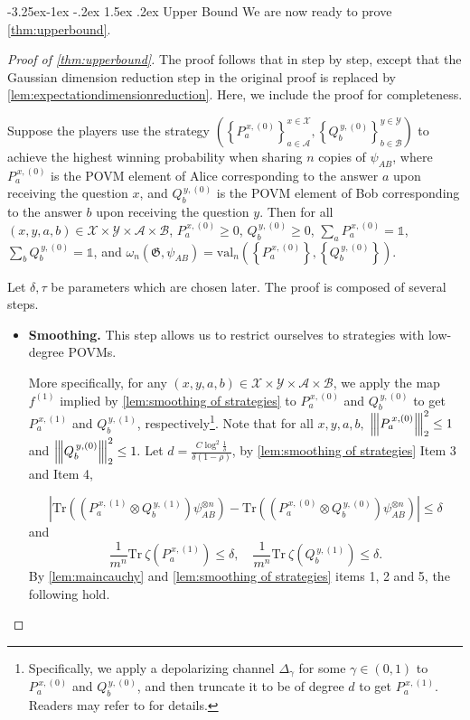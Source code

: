 \documentclass[10pt,a4paper]{article}
\makeatletter
\renewcommand{\subsection}{\@startsection{subsection}{2}{\z@}%
             {-3.25ex\@plus -1ex \@minus -.2ex}%
             {1.5ex \@plus .2ex}%
             {\normalfont\large\scshape\bfseries}}
\theoremstyle{plain}
\theoremstyle{definition}
\newcommand {\set} [1] {\ensuremath{ \left\lbrace #1 \right\rbrace }}
\newcommand {\br} [1] {\ensuremath{ \left( #1 \right) }}
\newcommand {\ab} [1] {\ensuremath{ \left| #1 \right| }}
\newcommand{\nnorm}[1]{{\left\vert\kern-0.25ex\left\vert\kern-0.25ex\left\vert #1
		\right\vert\kern-0.25ex\right\vert\kern-0.25ex\right\vert}}
\newcommand {\Tr} {\ensuremath{ \mathrm{Tr} }}
\newcommand {\id} {\ensuremath{\mathds{1}}}
\newcommand{\gval}[3]{\ensuremath{\mathrm{val}_{#1}\br{\set{#2},\set{#3}}}}
\newcommand{\fourtuples}{\ensuremath{\br{x,y,a,b}\in\calX\times\calY\times\calA\times\calB}}
\newcommand{\Pnn}[1] {\ensuremath{{P^{\,x, (#1)}_a}}}
\newcommand{\Qnn}[1] {\ensuremath{{Q^{\,y, (#1)}_b}}}
\newcommand{\calX}{\mathcal{X}}
\newcommand{\calY}{\mathcal{Y}}
\newcommand{\calA}{\mathcal{A}}
\newcommand{\calB}{\mathcal{B}}
\newcommand{\1}{\mathbb{1}} %
\makeatother
\begin{document}
\subsection{Upper Bound}
We are now ready to prove \cref{thm:upperbound}.
\begin{proof}[Proof of \cref{thm:upperbound}]
The proof follows that in \cite{qin2021nonlocal} step by step, except that the Gaussian dimension reduction step in the original proof is replaced by \cref{lem:expectationdimensionreduction}. 
Here, we include the proof for completeness.

Suppose the players use the strategy $\br{\set{\Pnn{0}}^{x\in\calX}_{a\in\calA},\set{\Qnn{0}}^{y\in\calY}_{b\in\calB}}$ to achieve the highest winning probability when sharing $n$ copies of $\psi_{AB}$, where $\Pnn{0}$ is the POVM element of Alice corresponding to the answer $a$ upon receiving the question $x$, and $\Qnn{0}$ is the POVM element of Bob corresponding to the answer $b$ upon receiving the question $y$. Then for all $\br{x,y,a,b}\in\calX\times\calY\times\calA\times\calB$, $\Pnn{0}\geq0$, $\Qnn{0}\geq0$, $\sum_a\Pnn{0}=\id$, $\sum_b\Qnn{0}=\id$, and $\omega_n(\mathfrak{G},\psi_{AB})=\gval{n}{\Pnn{0}}{\Qnn{0}}$.

Let $\delta,\tau$ be parameters which are chosen later. The proof is composed of several steps.

\begin{itemize}
\item \textbf{Smoothing.} This step allows us to restrict ourselves to strategies with low-degree POVMs.

 More specifically, for any \fourtuples, we apply the map $f^{(1)}$ implied by \cref{lem:smoothing of strategies} to $\Pnn{0}$ and $\Qnn{0}$ to get $\Pnn{1}$ and $\Qnn{1}$, respectively\footnote{Specifically, we apply a depolarizing channel $\Delta_\gamma$ for some $\gamma\in(0,1)$ to $\Pnn{0}$ and $\Qnn{0}$, and then truncate it to be of degree $d$ to get $\Pnn{1}$. Readers may refer to \cite{qin2021nonlocal} for details.}. Note that for all $x,y,a,b,$ $\nnorm{\Pnn{0}}_2^2\leq1$ and $\nnorm{\Qnn{0}}_2^2\leq1.$ Let $d=\frac{C\log^2\frac{1}{\delta}}{\delta(1-\rho)}$, by \cref{lem:smoothing of strategies} Item 3 and Item 4, 

			\[\ab{\Tr\br{\br{\Pnn{1}\otimes \Qnn{1}}\psi^{\otimes n}_{AB}}-\Tr\br{\br{\Pnn{0}\otimes \Qnn{0}}\psi^{\otimes n}_{AB}}}\leq\delta\]
			and
		\[\frac{1}{m^n}\Tr~\zeta(\Pnn{1})\leq\delta,\quad\frac{1}{m^n}\Tr~\zeta(\Qnn{1})\leq\delta.\]
     By \cref{lem:maincauchy} and \cref{lem:smoothing of strategies} items 1, 2 and 5, the following hold.
     

\end{itemize}
\end{proof}
\end{document}
